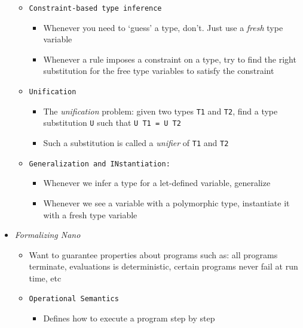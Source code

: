 \documentclass[landscape,8pt]{extarticle}
\newcommand{\code}{\lstinline}
\begin{document}
\begin{multicols}{3}
\begin{itemize}
\begin{itemize}
\begin{itemize}
                        \end{itemize}
                        \item \code{Constraint-based type inference}
                        \begin{itemize}
                            \item Whenever you need to `guess' a type, don't. Just use a \emph{fresh} type variable
                            \item Whenever a rule imposes a constraint on a type, try to find the right substitution for the free type variables to satisfy the constraint
                        \end{itemize}
                        \item \code{Unification}
                        \begin{itemize}
                            \item The \emph{unification} problem: given two types \code{T1} and \code{T2}, find a type substitution \code{U} such that \code{U T1 = U T2}
                            \item Such a substitution is called a \emph{unifier} of \code{T1} and \code{T2}
                        \end{itemize}
                        \item \code{Generalization and INstantiation:}
                        \begin{itemize}
                            \item Whenever we infer a type for a let-defined variable, generalize
                            \item Whenever we see a variable with a polymorphic type, instantiate it with a fresh type variable
                        \end{itemize}
              \end{itemize}
              \item \emph{Formalizing Nano}
              \begin{itemize}
                  \item Want to guarantee properties about programs such as: all programs terminate, evaluations is deterministic, certain programs never fail at run time, etc
                  \item \code{Operational Semantics}
                  \begin{itemize}
                      \item Defines how to execute a program step by step

\end{itemize}
\end{itemize}
\end{itemize}
\end{multicols}
\end{document}
